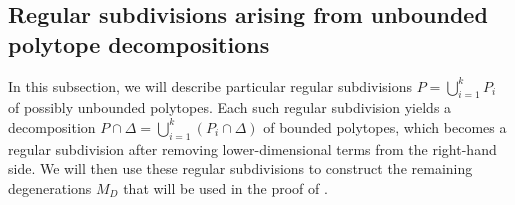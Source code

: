 \documentclass[12pt]{amsart}
\newcommand{\mb}{\mathbb}
\newcommand{\mc}{\mathcal}
\newcommand{\wt}{\widetilde}
\theoremstyle{plain}
\theoremstyle{definition}
\theoremstyle{remark}
\begin{document}

\subsection{Regular subdivisions arising from unbounded polytope decompositions} In this subsection, we will describe particular regular subdivisions $P = \bigcup_{i=1}^k P_i$ of possibly unbounded polytopes. Each such regular subdivision yields a decomposition $P \cap \Delta = \bigcup_{i=1}^k (P_i \cap \Delta)$ of bounded polytopes, which becomes a regular subdivision after removing lower-dimensional terms from the right-hand side. We will then use these regular subdivisions to construct the remaining degenerations $M_D$ that will be used in the proof of .
\end{document}

